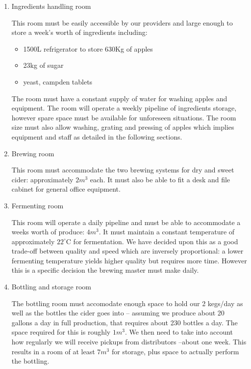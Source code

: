 \documentclass[11pt]{article}
\begin{document}
  \begin{enumerate}
  \item Ingredients handling room

This room must be easily accessible by our providers and large enough to store a
week's worth of ingredients including:

    \begin{itemize}
    \item 1500L refrigerator to store 630Kg of apples
    \item 23kg of sugar
    \item yeast, campden tablets
    \end{itemize}

The room must have a constant supply of water for washing apples and equipment. 
The room will operate a weekly pipeline of ingredients storage, however spare 
space must be available for unforeseen situations. The room size must also allow
 washing, grating and pressing of apples which implies equipment and staff as 
detailed in the following sections.

  \item Brewing room

This room must accommodate the two brewing systems for dry and sweet cider: 
approximately $2m^3$ each. It must also be able to fit a desk and file cabinet 
for general office equipment.

  \item Fermenting room

This room will operate a daily pipeline and must be able to accommodate a weeks
 worth of produce: $4m^3$. It must maintain a constant temperature of 
approximately $22^\circ$C for fermentation. We have decided upon this as a good 
trade-off between quality and speed which are inversely proportional: a lower 
fermenting temperature yields higher quality but requires more time. However 
this is a specific decision the brewing master must make daily.

  \item Bottling and storage room

The bottling room must accomodate enough space to hold our 2 kegs/day as well
as the bottles the cider goes into -- assuming we produce about 20 gallons a 
day in full production, that requires about 230 bottles a day. The space 
required for this is roughly $1m^3$. We then need to take into account how 
regularly we will receive pickups from distributors --about one week. This 
results in a room of at least $7m^3$ for storage, plus space to actually perform
the bottling.


\end{enumerate}
\end{document}
